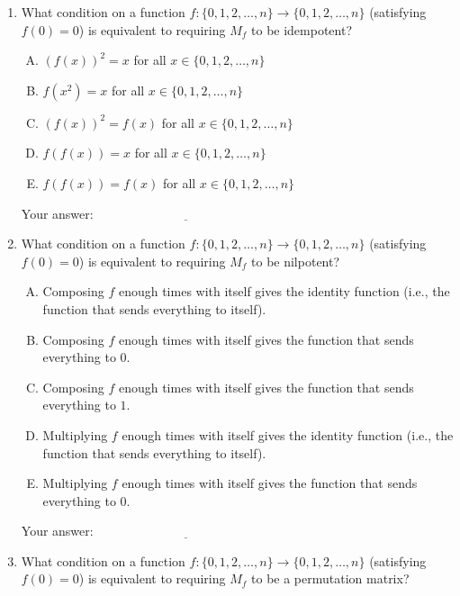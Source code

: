 \documentclass[10pt]{amsart}
\begin{document}
\begin{enumerate}
\item What condition on a function $f: \{ 0,1,2,\dots, n\} \to \{
  0,1,2,\dots,n\}$ (satisfying $f(0) = 0$) is equivalent to requiring
  $M_f$ to be idempotent?

  \begin{enumerate}[(A)]
  \item $(f(x))^2 = x$ for all $x \in \{ 0,1,2,\dots,n\}$
  \item $f(x^2) = x$ for all $x \in \{ 0,1,2,\dots,n \}$
  \item $(f(x))^2 = f(x)$ for all $x \in \{ 0,1,2,\dots,n\}$
  \item $f(f(x)) = x$ for all $x \in \{ 0,1,2,\dots,n\}$
  \item $f(f(x)) = f(x)$ for all $x \in \{0,1,2,\dots,n \}$
  \end{enumerate}

  \vspace{0.1in}
  Your answer: $\underline{\qquad\qquad\qquad\qquad\qquad\qquad\qquad}$
  \vspace{0.1in}

\item What condition on a function $f: \{ 0,1,2,\dots, n\} \to \{
  0,1,2,\dots,n\}$ (satisfying $f(0) = 0$) is equivalent to requiring
  $M_f$ to be nilpotent?

  \begin{enumerate}[(A)]
  \item Composing $f$ enough times with itself gives the identity
    function (i.e., the function that sends everything to itself).
  \item Composing $f$ enough times with itself gives the function that
    sends everything to $0$.
  \item Composing $f$ enough times with itself gives the function that
    sends everything to $1$.
  \item Multiplying $f$ enough times with itself gives the identity
    function (i.e., the function that sends everything to itself).
  \item Multiplying $f$ enough times with itself gives the function
    that sends everything to $0$.
  \end{enumerate}

  \vspace{0.1in}
  Your answer: $\underline{\qquad\qquad\qquad\qquad\qquad\qquad\qquad}$
  \vspace{0.1in}

\item What condition on a function $f: \{ 0,1,2,\dots, n\} \to \{
  0,1,2,\dots,n\}$ (satisfying $f(0) = 0$) is equivalent to requiring
  $M_f$ to be a permutation matrix?


\end{enumerate}
\end{document}
